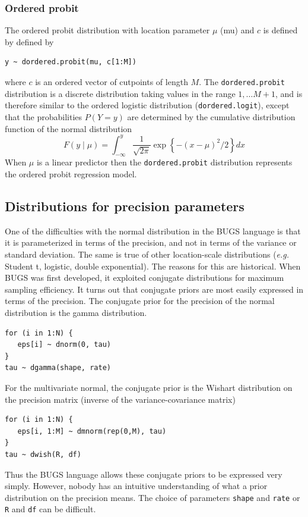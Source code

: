 \documentclass[11pt, a4paper, titlepage]{report}
\begin{document}
\subsubsection{Ordered probit}

The ordered probit distribution with location parameter $\mu$ (mu)
and $c$ is defined by
defined by
\begin{verbatim}
y ~ dordered.probit(mu, c[1:M])
\end{verbatim}
where $c$ is an ordered vector of cutpoints of length $M$. The
\texttt{dordered.probit} distribution is a discrete distribution taking
values in the range $1, \ldots M+1$, and is therefore similar to the ordered
logistic distribution (\texttt{dordered.logit}), except that
the probabilities $P(Y=y)$ are determined by the cumulative
distribution function of the normal distribution
\[
F(y \mid \mu) = \int_{-\infty}^y \frac{1}{\sqrt{2\pi}}
\exp\left\{ -(x - \mu)^2 /2 \right\} dx
\]
When $\mu$ is a linear predictor then the \texttt{dordered.probit}
distribution represents the ordered probit regression model.

\subsection{Distributions for precision parameters}

One of the difficulties with the normal distribution in the BUGS
language is that it is parameterized in terms of the precision, and not
in terms of the variance or standard deviation. The same is true of
other location-scale distributions ({\em e.g.} Student t, logistic,
double exponential). The reasons for this are historical. When BUGS
was first developed, it exploited conjugate distributions for maximum
sampling efficiency. It turns out that conjugate priors are most
easily expressed in terms of the precision. The conjugate prior for
the precision of the normal distribution is the gamma distribution.
\begin{verbatim}
for (i in 1:N) {
   eps[i] ~ dnorm(0, tau)
}
tau ~ dgamma(shape, rate)
\end{verbatim}
For the multivariate normal, the conjugate prior is the Wishart
distribution on the precision matrix (inverse of the
variance-covariance matrix)
\begin{verbatim}
for (i in 1:N) {
   eps[i, 1:M] ~ dmnorm(rep(0,M), tau)
}
tau ~ dwish(R, df)
\end{verbatim}
Thus the BUGS language allows these conjugate priors to be expressed
very simply. However, nobody has an intuitive understanding of what a
prior distribution on the precision means. The choice of parameters
\texttt{shape} and \texttt{rate} or \texttt{R} and \texttt{df} can be
difficult.
\end{document}
